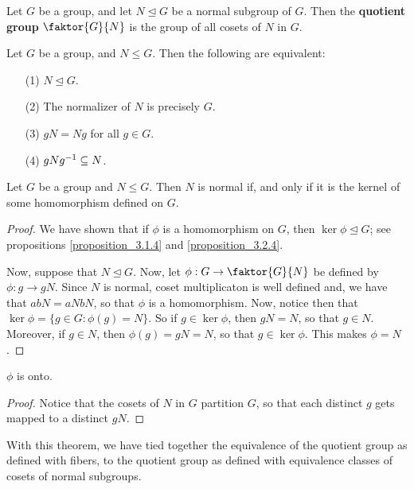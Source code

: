 \begin{definition}
  Let $G$ be a group, and let $N \unlhd G$ be a normal subgroup of $G$. Then
  the  \textbf{quotient group} $\faktor{G}{N}$ is the group of all cosets of
  $N$ in  $G$.
\end{definition}

\begin{proposition}\label{proposition_3.2.4}
  Let $G$ be a group, and  $N \leq G$. Then the following are equivalent:
  \begin{enumerate}
    \item[(1)] $N \unlhd G$.

    \item [(2)] The normalizer of $N$ is precisely  $G$.

    \item[(3)] $gN=Ng$ for all  $g \in G$.

    \item [(4)] $gNg^{-1} \subseteq N$.
  \end{enumerate}
\end{proposition}

\begin{theorem}\label{theorem_3.2.5}
  Let $G$ be a group and  $N \leq G$. Then  $N$ is normal if, and only if it
  is the kernel of some homomorphism defined on $G$.
\end{theorem}
\begin{proof}
  We have shown that if $\phi$ is a homomorphism on  $G$, then  $\ker{\phi}
  \unlhd G$; see propositions \ref{proposition_3.1.4} and \ref{proposition_3.2.4}.

  Now, suppose that $N \unlhd G$. Now, let $\phi:G \rightarrow \faktor{G}{N}$
  be defined by $\phi:g \rightarrow gN$. Since $N$ is normal, coset
  multiplicaton is well defined and, we have that $abN=aNbN$, so that $\phi$
  is a homomorphism. Now, notice then that
  $\ker{\phi}=\{g \in G : \phi(g)=N\}$. So if $g \in \ker{\phi}$, then $gN=N$,
  so that $g \in N$. Moreover, if  $g \in N$, then  $\phi(g)=gN=N$, so that $g
  \in \ker{\phi}$. This makes $\phi=N$.
\end{proof}
\begin{corollary}
  $\phi$ is onto.
\end{corollary}
\begin{proof}
  Notice that the cosets of $N$ in  $G$ partition  $G$, so that each distinct
  $g$ gets mapped to a distinct $gN$.
\end{proof}
\begin{remark}
  With this theorem, we have tied together the equivalence of the quotient
  group as defined with fibers, to the quotient group as defined with
  equivalence classes of cosets of normal subgroups.
\end{remark}

